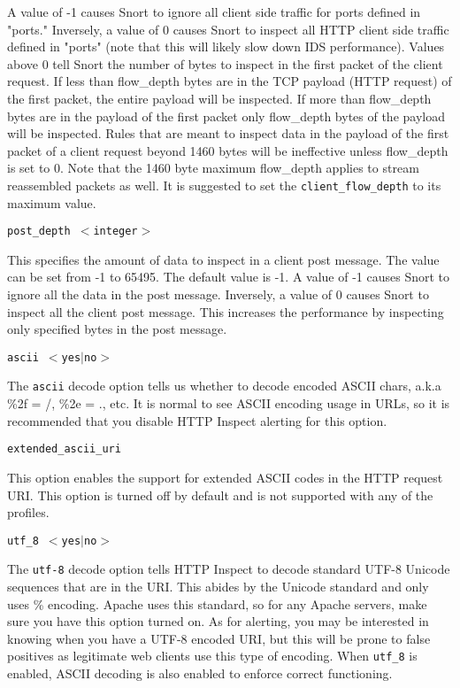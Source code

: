 \documentclass[english]{report}
\newcounter{slistnum}
\newenvironment{slist}
{ \begin{list}{ {\bf \arabic{slistnum}.} }{\usecounter{slistnum} } }
{ \end{list} }
\begin{document}
\begin{slist}
A value of -1 causes Snort to ignore all client side traffic for ports
defined in "ports." Inversely, a value of 0 causes Snort to inspect all HTTP client
 side traffic defined in "ports" (note that this will likely slow down IDS
performance).  Values above 0 tell Snort the number of bytes to
inspect in the first packet of the client request.  If less than flow\_depth bytes
are in the TCP payload (HTTP request) of the first packet, the entire payload will be inspected.
If more than flow\_depth bytes are in the payload of the first packet only flow\_depth
bytes of the payload will be inspected.  Rules that are meant to
inspect data in the payload of the first packet of a client request beyond 1460 bytes 
will be ineffective unless flow\_depth is set to 0. Note that the 1460 byte 
maximum flow\_depth applies to stream reassembled packets as well. It is 
suggested to set the \texttt{client\_flow\_depth} to its maximum value.

\item \texttt{post\_depth $<$integer$>$}

This specifies the amount of data to inspect in a client post message. The
value can be set from -1 to 65495. The default value is -1. A value of -1 
causes Snort to ignore all the data in the post message. Inversely, a value 
of 0 causes Snort to inspect all the client post message. This increases    
the performance by inspecting only specified bytes in the post message.

\item \texttt{ascii $<$yes$|$no$>$}

The \texttt{ascii} decode option tells us whether to decode encoded ASCII
chars, a.k.a \%2f = /, \%2e = ., etc.  It is normal to see ASCII encoding usage
in URLs, so it is recommended that you disable HTTP Inspect alerting for this
option.

\item \texttt{extended\_ascii\_uri}

This option enables the support for extended ASCII codes in the HTTP request
URI. This option is turned off by default and is not supported with any of
the profiles.

\item \texttt{utf\_8 $<$yes$|$no$>$}

The \texttt{utf-8} decode option tells HTTP Inspect to decode standard UTF-8
Unicode sequences that are in the URI.  This abides by the Unicode standard and
only uses \% encoding.  Apache uses this standard, so for any Apache servers,
make sure you have this option turned on.  As for alerting, you may be
interested in knowing when you have a UTF-8 encoded URI, but this will be prone
to false positives as legitimate web clients use this type of encoding.  When
\texttt{utf\_8} is enabled, ASCII decoding is also enabled to enforce correct
functioning.  


\end{slist}
\end{document}

